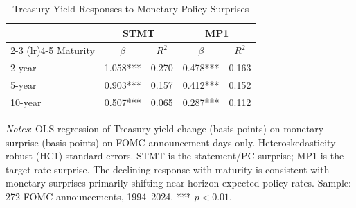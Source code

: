 \begin{table}[htbp]
\centering
\caption{Treasury Yield Responses to Monetary Policy Surprises}
\label{tab:treasury_response}
\begin{tabular}{lcccc}
\toprule
& \multicolumn{2}{c}{STMT} & \multicolumn{2}{c}{MP1} \\
\cmidrule(lr){2-3} \cmidrule(lr){4-5}
Maturity & $\beta$ & $R^2$ & $\beta$ & $R^2$ \\
\midrule
2-year & 1.058*** & 0.270 & 0.478*** & 0.163 \\
5-year & 0.903*** & 0.157 & 0.412*** & 0.152 \\
10-year & 0.507*** & 0.065 & 0.287*** & 0.112 \\
\bottomrule
\end{tabular}
\begin{flushleft}
\footnotesize \textit{Notes}: OLS regression of Treasury yield change (basis points)
on monetary surprise (basis points) on FOMC announcement days only.
Heteroskedasticity-robust (HC1) standard errors. STMT is the statement/PC surprise;
MP1 is the target rate surprise. The declining response with maturity is consistent
with monetary surprises primarily shifting near-horizon expected policy rates.
Sample: 272 FOMC announcements, 1994--2024. *** $p<0.01$.
\end{flushleft}
\end{table}
